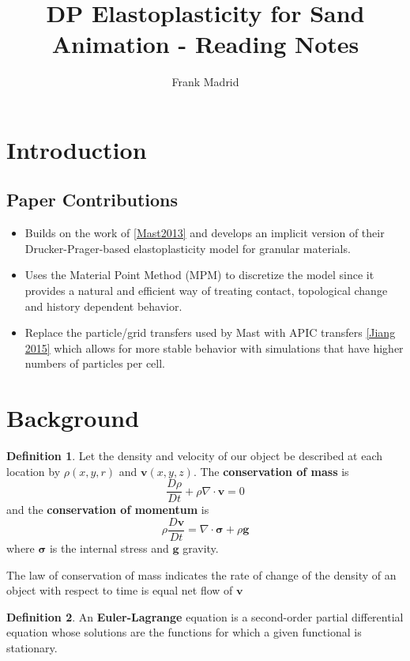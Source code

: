 \documentclass{article}
\theoremstyle{definition}
\newtheorem{definition}{Definition}
\begin{document}
\title{DP Elastoplasticity for Sand Animation - Reading Notes}
\author{Frank Madrid}
\maketitle

\section{Introduction}
\subsection{Paper Contributions}
\begin{itemize}
	\item Builds on the work of \ref{Mast2013} and develops an implicit version of their Drucker-Prager-based elastoplasticity model for granular materials.
	\item Uses the Material Point Method (MPM) to discretize the model since it provides a natural and efficient way of treating contact, topological change and history dependent behavior.
	\item Replace  the particle/grid transfers used by Mast with APIC transfers \ref{Jiang 2015} which allows for more stable behavior with simulations that have higher numbers of particles per cell.
\end{itemize}

\section{Background}

\begin{definition}
	Let the density and velocity of our object be described at each location by $\rho(x,y,r)$ and $\textbf{v}(x,y,z)$. The \textbf{conservation of mass} is
	\begin{equation*}
		\frac{D\rho}{Dt} + \rho\nabla \cdot \textbf{v}=0
	\end{equation*}
	and the \textbf{conservation of momentum} is
	\begin{equation*}
		\rho \frac{D\textbf{v}}{Dt} = \nabla \cdot \boldsymbol{\sigma} + \rho \textbf{g}
	\end{equation*}
	where $\boldsymbol{\sigma}$ is the internal stress and $\textbf{g}$ gravity.
\end{definition}
The law of conservation of mass indicates the rate of change of the density of an object with respect to time is equal net flow of $\textbf{v}$
\begin{definition}
	An \textbf{Euler-Lagrange} equation is a second-order partial differential equation whose solutions are the functions for which a given functional is stationary.
\end{definition}
\end{document}
